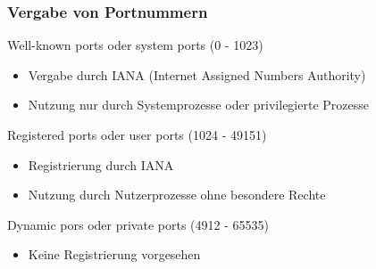     \subsubsection{Vergabe von Portnummern}
      Well-known ports oder system ports (0 - 1023)
      \begin{itemize}
        \item Vergabe durch IANA (Internet Assigned Numbers Authority)
        \item Nutzung nur durch Systemprozesse oder privilegierte Prozesse
      \end{itemize}
      Registered ports oder user ports (1024 - 49151)
      \begin{itemize}
        \item Registrierung durch IANA
        \item Nutzung durch Nutzerprozesse ohne besondere Rechte
      \end{itemize}
      Dynamic pors oder private ports (4912 - 65535)
      \begin{itemize}
        \item Keine Registrierung vorgesehen
      \end{itemize}
